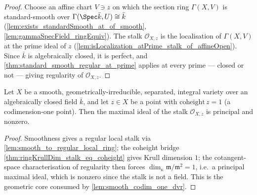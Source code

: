 \begin{proof}
  \leanok
  Choose an affine chart \(V \ni z\) on which the section ring
  \(\Gamma(X, V)\) is standard-smooth over
  \(\Gamma(\Spec \bar k, U) \cong \bar k\)
  (\cref{lem:exists_standardSmooth_at_of_smooth},
  \cref{lem:gammaSpecField_ringEquiv}). The stalk \(\mathcal O_{X,z}\) is the
  localisation of \(\Gamma(X, V)\) at the prime ideal of \(z\)
  (\cref{lem:isLocalization_atPrime_stalk_of_affineOpen}). Since \(\bar k\) is
  algebraically closed, it is perfect, and
  \cref{thm:standard_smooth_regular_at_prime} applies at every prime — closed
  or not — giving regularity of \(\mathcal O_{X,z}\).
\end{proof}

\begin{lemma}
  \label{lem:smooth_codim_one_maximalIdeal_principal}
  Let \(X\) be a smooth, geometrically-irreducible, separated, integral variety over an
  algebraically closed field \(\bar k\), and let \(z \in X\) be a point with
  \(\mathrm{coheight}\,z = 1\) (a codimension-one point). Then the maximal ideal of the
  stalk \(\mathcal O_{X,z}\) is principal and nonzero.
\end{lemma}

\begin{proof}
  Smoothness gives a regular local stalk via
  \cref{lem:smooth_to_regular_local_ring}; the coheight bridge
  \cref{thm:ringKrullDim_stalk_eq_coheight} gives Krull dimension \(1\); the
  cotangent-space characterisation of regularity then forces
  \(\dim_\kappa \mathfrak m/\mathfrak m^2 = 1\), i.e.\ a principal maximal ideal, which
  is nonzero since the stalk is not a field. This is the geometric core consumed by
  \cref{lem:smooth_codim_one_dvr}.
\end{proof}

